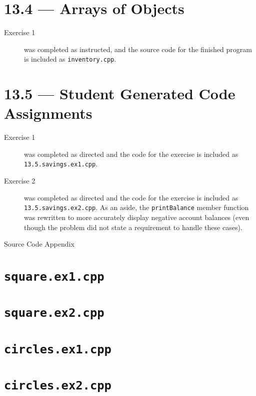 \documentclass[11pt]{article}
\begin{document}
\section*{13.4 --- Arrays of Objects}
\begin{description}
    \item[Exercise 1] was completed as instructed, and the source code for the finished program is included as \texttt{inventory.cpp}.
\end{description}

\section*{13.5 --- Student Generated Code Assignments}
\begin{description}
    \item[Exercise 1] was completed as directed and the code for the exercise is included as \texttt{13.5.savings.ex1.cpp}.
    \item[Exercise 2] was completed as directed and the code for the exercise is included as \texttt{13.5.savings.ex2.cpp}. As an aside, the \lstinline{printBalance} member function was rewritten to more accurately display negative account balances (even though the problem did not state a requirement to handle these cases).
\end{description}


\newpage
{\LARGE Source Code Appendix}

\section*{\texttt{square.ex1.cpp}}

\newpage

\section*{\texttt{square.ex2.cpp}}

\newpage

\section*{\texttt{circles.ex1.cpp}}

\newpage

\section*{\texttt{circles.ex2.cpp}}

\newpage
\end{document}
